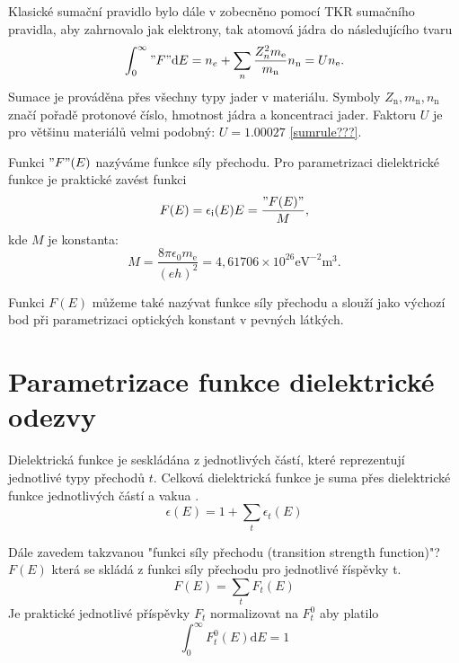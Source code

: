 Klasické sumační pravidlo bylo dále v \cite{sumrule} zobecněno pomocí TKR sumačního pravidla, aby zahrnovalo jak elektrony, tak atomová jádra do následujícího tvaru
\begin{equation}
\int_0^\infty "F" \mathrm{d}E = n_e + \sum_n \frac{Z_n^2 m_\mathrm{e}} {m_\mathrm{n}} n_\mathrm{n} = U n_\mathrm{e} \mathrm{.} %
\end{equation}
Sumace je prováděna přes všechny typy jader v materiálu. Symboly $Z_\mathrm{n}, m_\mathrm{n}, n_\mathrm{n}$ značí pořadě protonové číslo, hmotnost jádra a koncentraci jader. Faktoru $U$ je pro většinu materiálů velmi podobný: $U = 1.00027$ \ref{sumrule???}.

Funkci $"F"(E)$ nazýváme funkce síly přechodu. Pro parametrizaci dielektrické funkce je praktické zavést funkci
\begin{equation}
F(E) = \epsilon_\mathrm{i}(E) E = \frac{"F(E)"}{M}\mathrm{,}
\end{equation}  
kde $M$ je konstanta:
\begin{equation} 
M = \frac{8 \pi \epsilon_0 m_\mathrm{e}}{(e h)^2} = 4,61706\times10^{26} \mathrm{eV}^{-2}\mathrm{m}^3 \mathrm{.}
\end{equation}

Funkci $F(E)$ můžeme také nazývat funkce síly přechodu a slouží jako výchozí bod při parametrizaci optických konstant v pevných látkých.

\section{ Parametrizace funkce dielektrické  odezvy}
Dielektrická funkce je seskládána z jednotlivých částí, které reprezentují jednotlivé typy přechodů $t$. Celková dielektrická funkce je suma přes dielektrické funkce jednotlivých částí a vakua \cite{sumrule1}. 
\begin{equation}
\epsilon(E) = 1 + \sum_t \epsilon_t(E)
\label{suma1}
\end{equation}

Dále zavedem takzvanou "funkci síly přechodu (transition strength function)"? $F(E)$ která se skládá z funkci síly přechodu pro jednotlivé říspěvky t.
\begin{equation}
F(E) = \sum_t F_t(E)
\end{equation}
Je praktické jednotlivé příspěvky $F_t$ normalizovat na $F_t^0$ aby platilo
\begin{equation}
\int_0^\infty F_t^0(E)\mathrm{d}E = 1
\end{equation}

